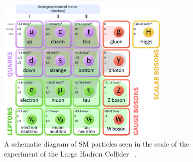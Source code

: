     \begin{figure}[!htb]
        \begin{center}
            \includegraphics[width=0.75\textwidth]{figures/chapter_SM/SM}
            \caption{
                A schematic diagram of SM particles seen in the scale of the experiment of the Large Hadron Collider ~\cite{enwiki:1060203113}.
            }
            \label{fig:SM}
        \end{center}
    \end{figure}


%
%
%
%
%




